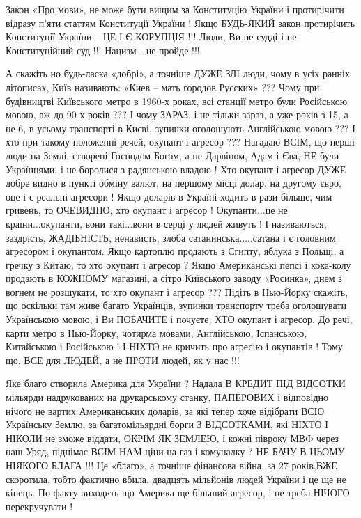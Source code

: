 \begin{itemize}
Закон «Про мови», не може бути вищим за Конституцію України і протирічити
відразу п’яти статтям Конституції України ! Якщо БУДЬ-ЯКИЙ закон протирічить
Конституції України – ЦЕ І Є КОРУПЦІЯ !!! Люди, Ви не судді і не Конституційний
суд !!! Нацизм - не пройде !!!

А скажіть но будь-ласка «добрі», а точніше ДУЖЕ ЗЛІ люди, чому в усіх ранніх
літописах, Київ називають: «Киев – мать городов Русских» ??? Чому при
будівництві Київського метро в 1960-х роках, всі станції метро були Російською
мовою, аж до 90-х років ??? І чому ЗАРАЗ, і не тільки зараз, а уже років з 15,
а не 6, в усьому транспорті в Києві, зупинки оголошують Англійською мовою ??? І
хто при такому положенні речей, окупант і агресор ??? Нагадаю ВСІМ, що перші
люди на Землі, створені Господом Богом, а не Дарвіном, Адам і Єва, НЕ були
Українцями, і не боролися з радянською владою ! Хто окупант і агресор ДУЖЕ
добре видно в пункті обміну валют, на першому місці долар, на другому євро, оце
і є реальні агресори ! Якщо доларів в Україні ходить в рази більше, чим
гривень, то ОЧЕВИДНО, хто окупант і агресор ! Окупанти...це не країни...окупанти,
вони такі...вони в серці у людей живуть ! І називаються, заздрість, ЖАДІБНІСТЬ,
ненависть, злоба сатанинська.....сатана і є головним агресором і окупантом. Якщо
картоплю продають з Єгипту, яблука з Польщі, а гречку з Китаю, то хто окупант і
агресор ? Якщо Американські пепсі і кока-колу продають в КОЖНОМУ магазині, а
сітро Київського заводу «Росинка», днем з вогнем не розшукати, то хто окупант і
агресор ??? Підіть в Нью-Йорку скажіть, що оскільки там живе багато Українців,
зупинки транспорту треба оголошувати Українською мовою, і Ви ПОБАЧИТЕ і
почуєте, ХТО окупант і агресор. До речі, карти метро в Нью-Йорку, чотирма
мовами, Англійською, Іспанською, Китайською і Російською ! І НІХТО не кричить
про агресію і окупантів ! Тому що, ВСЕ для ЛЮДЕЙ, а не ПРОТИ людей, як у нас
!!!

Яке благо створила Америка для України ? Надала В КРЕДИТ ПІД ВІДСОТКИ мільярди
надрукованих на друкарському станку, ПАПЕРОВИХ і відповідно нічого не вартих
Американських доларів, за які тепер хоче відібрати ВСЮ Українську Землю, за
багатомільярдні борги З ВІДСОТКАМИ, які НІХТО І НІКОЛИ не зможе віддати, ОКРІМ
ЯК ЗЕМЛЕЮ, і кожні півроку МВФ через наш Уряд, піднімає ВСІМ НАМ ціни на газ і
комуналку ? НЕ БАЧУ В ЦЬОМУ НІЯКОГО БЛАГА !!! Це «благо», а точніше фінансова
війна, за 27 років,ВЖЕ скоротила, тобто фактично вбила, двадцять мільйонів
людей України і це ще не кінець. По факту виходить що Америка ще більший
агресор, і не треба НІЧОГО перекручувати !


\end{itemize}
